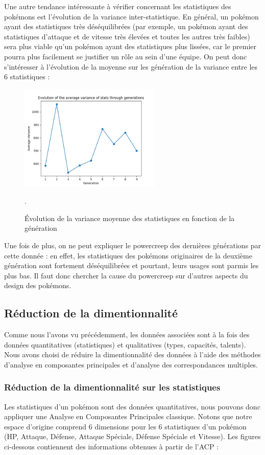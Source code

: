 \documentclass[a4paper,12pt]{article}
\begin{document}
Une autre tendance intéressante à vérifier concernant les statistiques des
pokémons est l'évolution de la variance inter-statistique. En général, un
pokémon ayant des statistiques très déséquilibrées (par exemple, un pokémon
ayant des statistiques d'attaque et de vitesse très élevées et toutes les autres
très faibles) sera plus viable qu'un pokémon ayant des statistiques plus
lissées, car le premier pourra plus facilement se justifier un rôle au sein
d'une équipe. On peut donc s'intéresser à l'évolution de la moyenne sur les
génération de la variance entre les 6 statistiques :

\begin{figure}[htbp]
    \centering
    \includegraphics[width=0.6\textwidth]{Image/avg_var_stats_per_generation.png}
    \caption{Évolution de la variance moyenne des statistiques en fonction de la
    génération}.
    \label{fig:image6}
\end{figure}

Une fois de plus, on ne peut expliquer le powercreep des dernières générations
par cette donnée : en effet, les statistiques des pokémons originaires de la
deuxième génération sont fortement déséquilibrées et pourtant, leurs usages sont
parmis les plus bas. Il faut donc chercher la cause du powercreep sur d'autres
aspects du design des pokémons.

\subsection{Réduction de la dimentionnalité}
Comme nous l'avons vu précédemment, les données associées sont à la fois des
données quantitatives (statistiques) et qualitatives (types, capacités,
talents). Nous avons choisi de réduire la dimentionnalité des données à l'aide
des méthodes d'analyse en composantes principales et d'analyse des
correspondances multiples.

\subsubsection{Réduction de la dimentionnalité sur les statistiques}
Les statistiques d'un pokémon sont des données quantitatives, nous pouvons donc
appliquer une Analyse en Composantes Principales classique. Notons que notre
espace d'origine comprend 6 dimensions pour les 6 statistiques d'un pokémon (HP,
Attaque, Défense, Attaque Spéciale, Défense Spéciale et Vitesse). Les figures
ci-dessous contiennent des informations obtenues à partir de l'ACP :
\end{document}
